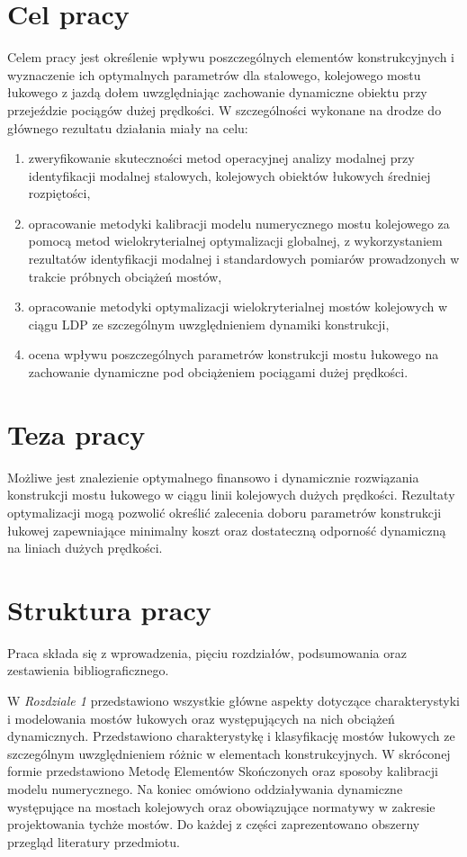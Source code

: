 \section*{Cel pracy}
Celem pracy jest określenie wpływu poszczególnych elementów konstrukcyjnych i wyznaczenie ich optymalnych parametrów dla stalowego, kolejowego mostu łukowego z jazdą dołem uwzględniając zachowanie dynamiczne obiektu przy przejeździe pociągów dużej prędkości.
W szczególności wykonane na drodze do głównego rezultatu działania miały na celu:
\begin{enumerate}
	\item zweryfikowanie skuteczności metod operacyjnej analizy modalnej przy identyfikacji modalnej stalowych, kolejowych obiektów łukowych średniej rozpiętości,
	\item opracowanie metodyki kalibracji modelu numerycznego mostu kolejowego za pomocą metod wielokryterialnej optymalizacji globalnej, z wykorzystaniem rezultatów identyfikacji modalnej i standardowych pomiarów prowadzonych w trakcie próbnych obciążeń mostów,
	\item opracowanie metodyki optymalizacji wielokryterialnej mostów kolejowych w ciągu LDP ze szczególnym uwzględnieniem dynamiki konstrukcji,
	\item ocena wpływu poszczególnych parametrów konstrukcji mostu łukowego na zachowanie dynamiczne pod obciążeniem pociągami dużej prędkości.
\end{enumerate}


\section*{Teza pracy}
Możliwe jest znalezienie optymalnego finansowo i dynamicznie rozwiązania konstrukcji mostu łukowego w ciągu linii kolejowych dużych prędkości. Rezultaty optymalizacji mogą pozwolić określić zalecenia doboru parametrów konstrukcji łukowej zapewniające minimalny koszt oraz dostateczną odporność dynamiczną na liniach dużych prędkości.

\section*{Struktura pracy}
Praca składa się z wprowadzenia, pięciu rozdziałów, podsumowania oraz zestawienia bibliograficznego. 

W \textit{Rozdziale 1} przedstawiono wszystkie główne aspekty dotyczące charakterystyki i modelowania mostów łukowych oraz występujących na nich obciążeń dynamicznych. Przedstawiono charakterystykę i klasyfikację mostów łukowych ze szczególnym uwzględnieniem różnic w elementach konstrukcyjnych. W skróconej formie przedstawiono Metodę Elementów Skończonych oraz sposoby kalibracji modelu numerycznego. Na koniec omówiono oddziaływania dynamiczne występujące na mostach kolejowych oraz obowiązujące normatywy w zakresie projektowania tychże mostów. Do każdej z części zaprezentowano obszerny przegląd literatury przedmiotu.

